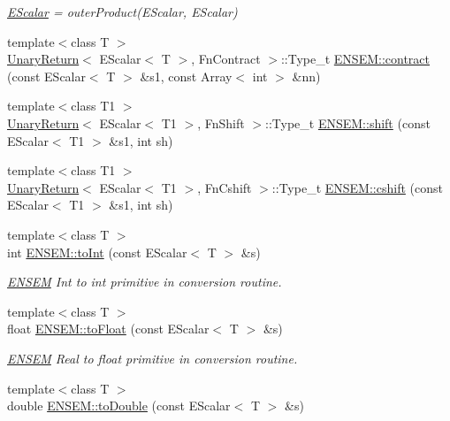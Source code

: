 \begin{DoxyCompactItemize}
\begin{DoxyCompactList}\small\item\em \mbox{\hyperlink{classENSEM_1_1EScalar}{E\+Scalar}} = outer\+Product(\+E\+Scalar, E\+Scalar) \end{DoxyCompactList}\item 
{\footnotesize template$<$class T $>$ }\\\mbox{\hyperlink{structUnaryReturn}{Unary\+Return}}$<$ E\+Scalar$<$ T $>$, Fn\+Contract $>$\+::Type\+\_\+t \mbox{\hyperlink{group__escalar_ga6c04652cc005e69e9785effa182a8436}{E\+N\+S\+E\+M\+::contract}} (const E\+Scalar$<$ T $>$ \&s1, const Array$<$ int $>$ \&nn)
\item 
{\footnotesize template$<$class T1 $>$ }\\\mbox{\hyperlink{structUnaryReturn}{Unary\+Return}}$<$ E\+Scalar$<$ T1 $>$, Fn\+Shift $>$\+::Type\+\_\+t \mbox{\hyperlink{group__escalar_gaeaac3a9b82b6d6c8f0ec25efb3242cfe}{E\+N\+S\+E\+M\+::shift}} (const E\+Scalar$<$ T1 $>$ \&s1, int sh)
\item 
{\footnotesize template$<$class T1 $>$ }\\\mbox{\hyperlink{structUnaryReturn}{Unary\+Return}}$<$ E\+Scalar$<$ T1 $>$, Fn\+Cshift $>$\+::Type\+\_\+t \mbox{\hyperlink{group__escalar_ga4a9bfa7287ccf8fef9605aa9e9a44884}{E\+N\+S\+E\+M\+::cshift}} (const E\+Scalar$<$ T1 $>$ \&s1, int sh)
\item 
{\footnotesize template$<$class T $>$ }\\int \mbox{\hyperlink{group__escalar_ga332b1b685c28f8bdbf099f3e32016ad2}{E\+N\+S\+E\+M\+::to\+Int}} (const E\+Scalar$<$ T $>$ \&s)
\begin{DoxyCompactList}\small\item\em \mbox{\hyperlink{namespaceENSEM}{E\+N\+S\+EM}} Int to int primitive in conversion routine. \end{DoxyCompactList}\item 
{\footnotesize template$<$class T $>$ }\\float \mbox{\hyperlink{group__escalar_gaf21f130175f8bc3a98a90272dc196b2c}{E\+N\+S\+E\+M\+::to\+Float}} (const E\+Scalar$<$ T $>$ \&s)
\begin{DoxyCompactList}\small\item\em \mbox{\hyperlink{namespaceENSEM}{E\+N\+S\+EM}} Real to float primitive in conversion routine. \end{DoxyCompactList}\item 
{\footnotesize template$<$class T $>$ }\\double \mbox{\hyperlink{group__escalar_ga981890bacedbaccd67983030f792d927}{E\+N\+S\+E\+M\+::to\+Double}} (const E\+Scalar$<$ T $>$ \&s)

\end{DoxyCompactItemize}
